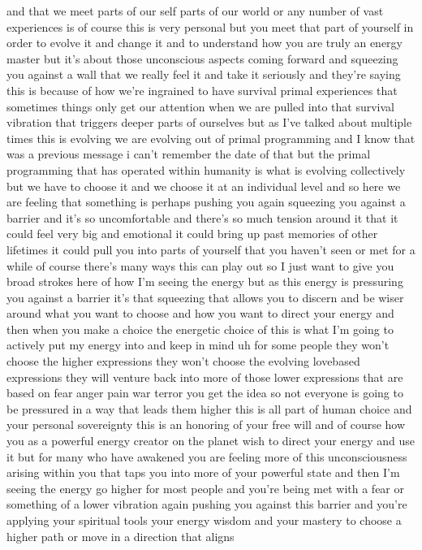 \documentclass{article}
\begin{document}
and that we meet parts of our self parts of our world or any number of
vast experiences is of course this is very personal but you meet that
part of yourself in order to evolve it and change it and to understand
how you are truly an energy master but it's about those unconscious
aspects coming forward and squeezing you against a wall that we really
feel it and take it seriously and they're saying this is because of how
we're ingrained to have survival primal experiences that sometimes
things only get our attention when we are pulled into that survival
vibration that triggers deeper parts of ourselves but as I've talked
about multiple times this is evolving we are evolving out of primal
programming and I know that was a previous message i can't remember the
date of that but the primal programming that has operated within
humanity is what is evolving collectively but we have to choose it and
we choose it at an individual level and so here we are feeling that
something is perhaps pushing you again squeezing you against a barrier
and it's so uncomfortable and there's so much tension around it that it
could feel very big and emotional it could bring up past memories of
other lifetimes it could pull you into parts of yourself that you
haven't seen or met for a while of course there's many ways this can
play out so I just want to give you broad strokes here of how I'm seeing
the energy but as this energy is pressuring you against a barrier it's
that squeezing that allows you to discern and be wiser around what you
want to choose and how you want to direct your energy and then when you
make a choice the energetic choice of this is what I'm going to actively
put my energy into and keep in mind uh for some people they won't choose
the higher expressions they won't choose the evolving lovebased
expressions they will venture back into more of those lower expressions
that are based on fear anger pain war terror you get the idea so not
everyone is going to be pressured in a way that leads them higher this
is all part of human choice and your personal sovereignty this is an
honoring of your free will and of course how you as a powerful energy
creator on the planet wish to direct your energy and use it but for many
who have awakened you are feeling more of this unconsciousness arising
within you that taps you into more of your powerful state and then I'm
seeing the energy go higher for most people and you're being met with a
fear or something of a lower vibration again pushing you against this
barrier and you're applying your spiritual tools your energy wisdom and
your mastery to choose a higher path or move in a direction that aligns
\end{document}

